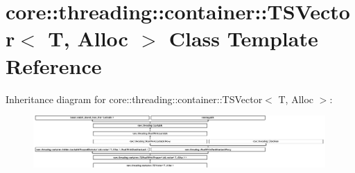 \hypertarget{classcore_1_1threading_1_1container_1_1_t_s_vector}{\section{core\-:\-:threading\-:\-:container\-:\-:T\-S\-Vector$<$ T, Alloc $>$ Class Template Reference}
\label{classcore_1_1threading_1_1container_1_1_t_s_vector}
}
Inheritance diagram for core\-:\-:threading\-:\-:container\-:\-:T\-S\-Vector$<$ T, Alloc $>$\-:\begin{figure}[H]
\begin{center}
\leavevmode
\includegraphics[height=1.970840cm]{classcore_1_1threading_1_1container_1_1_t_s_vector}
\end{center}
\end{figure}
